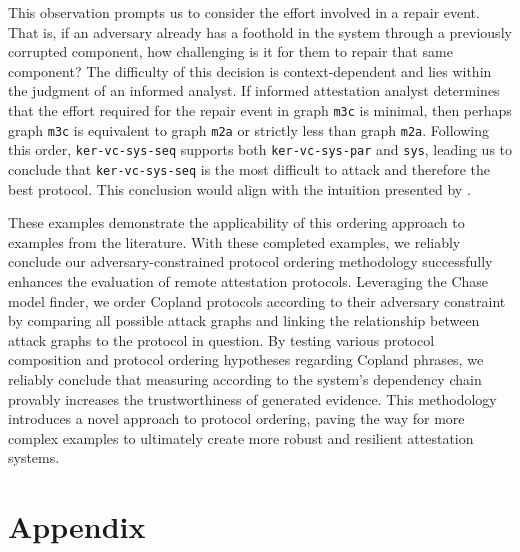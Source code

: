 \documentclass[runningheads]{llncs}
\theoremstyle{definition}
\begin{document}
This observation prompts us to consider the effort involved in a repair event. That is, if an adversary already has a foothold in the system through a previously corrupted component, how challenging is it for them to repair that same component? The difficulty of this decision is context-dependent and lies within the judgment of an informed analyst. If informed attestation analyst determines that the effort required for the repair event in graph \texttt{m3c} is minimal, then perhaps graph \texttt{m3c} is equivalent to graph \texttt{m2a} or strictly less than graph \texttt{m2a}. Following this order, \texttt{ker-vc-sys-seq} supports both \texttt{ker-vc-sys-par} and \texttt{sys}, leading us to conclude that \texttt{ker-vc-sys-seq} is the most difficult to attack and therefore the best protocol. This conclusion would align with the intuition presented by \citet{Rowe:2021:AutomatedTrust}.


These examples demonstrate the applicability of this ordering approach to examples from the literature. With these completed examples, we reliably conclude our adversary-constrained protocol ordering methodology successfully enhances the evaluation of remote attestation protocols. Leveraging the Chase model finder, we order Copland protocols according to their adversary constraint by comparing all possible attack graphs and linking the relationship between attack graphs to the protocol in question. By testing various protocol composition and protocol ordering hypotheses regarding Copland phrases, we reliably conclude that measuring according to the system's dependency chain provably increases the trustworthiness of generated evidence. This methodology introduces a novel approach to protocol ordering, paving the way for more complex examples to ultimately create more robust and resilient attestation systems.


\section*{Appendix}




%
% 
%
%
%

%

%
\end{document}
